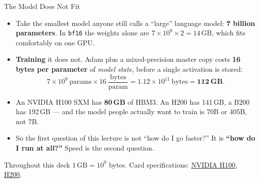 \begin{frame}{The Model Does Not Fit}
  \begin{itemize}\itemsep0.45em
    \item[\textcolor{red}{$\blacktriangleright$}] Take the smallest model anyone still calls a ``large'' language model: \textbf{7 billion parameters}. In \texttt{bf16} the weights alone are $7 \times 10^9 \times 2 = 14$\,GB, which fits comfortably on one GPU.
    \item[\textcolor{red}{$\blacktriangleright$}] \textbf{Training} it does not. Adam plus a mixed-precision master copy costs \textbf{16 bytes per parameter} of \emph{model state}, before a single activation is stored:
      \[
        7 \times 10^{9}\ \text{params} \times 16\ \frac{\text{bytes}}{\text{param}} = 1.12 \times 10^{11}\ \text{bytes} = \mathbf{112\ GB}.
      \]
    \item[\textcolor{red}{$\blacktriangleright$}] An NVIDIA H100 SXM has \textbf{80\,GB} of HBM3. An H200 has 141\,GB, a B200 has 192\,GB --- and the model people actually want to train is 70B or 405B, not 7B.
    \item[\textcolor{red}{$\blacktriangleright$}] So the first question of this lecture is not ``how do I go faster?'' It is \textbf{``how do I run at all?''} Speed is the second question.
  \end{itemize}
  \vspace{0.2em}
  {\scriptsize Throughout this deck $1\,\text{GB} = 10^{9}$ bytes. Card specifications: \href{https://www.nvidia.com/en-us/data-center/h100/}{NVIDIA H100}, \href{https://www.nvidia.com/en-us/data-center/h200/}{H200}.}
\end{frame}

